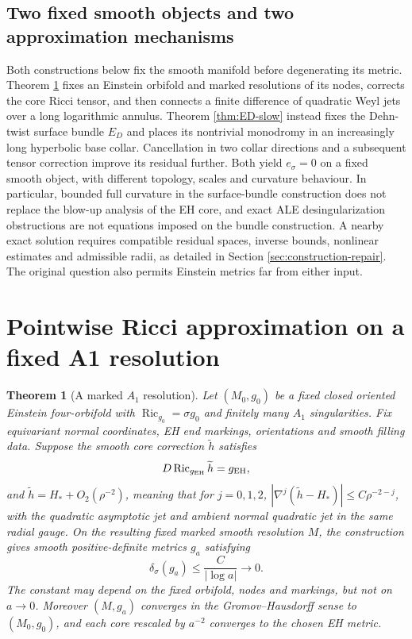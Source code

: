 \documentclass[a4paper,11pt]{article}
\numberwithin{equation}{section}
\newtheorem{theorem}{Theorem}[section]
\theoremstyle{definition}
\newcommand{\Ric}{\operatorname{Ric}}
\begin{document}
\subsection{Two fixed smooth objects and two approximation mechanisms}\label{sec:two-constructions}
Both constructions below fix the smooth manifold before degenerating its metric.
Theorem \ref{thm:A1} fixes an Einstein orbifold and marked resolutions of its nodes,
corrects the core Ricci tensor, and then connects a finite difference of quadratic Weyl jets over a long logarithmic annulus.
Theorem \ref{thm:ED-slow} instead fixes the Dehn-twist surface bundle $E_D$
and places its nontrivial monodromy in an increasingly long hyperbolic base collar.
Cancellation in two collar directions and a subsequent tensor correction improve its residual further.
Both yield $e_\sigma=0$ on a fixed smooth object, with different topology, scales and curvature behaviour.
In particular, bounded full curvature in the surface-bundle construction does not replace the blow-up analysis of the EH core,
and exact ALE desingularization obstructions are not equations imposed on the bundle construction.
A nearby exact solution requires compatible residual spaces, inverse bounds, nonlinear estimates and admissible radii,
as detailed in Section \ref{sec:construction-repair}. The original question also permits Einstein metrics far from either input.

\section{Pointwise Ricci approximation on a fixed A1 resolution}
\begin{theorem}[A marked $A_1$ resolution]\label{thm:A1}
Let $(M_0,g_0)$ be a fixed closed oriented Einstein four-orbifold with $\Ric_{g_0}=\sigma g_0$ and finitely many $A_1$ singularities. Fix equivariant normal coordinates, EH end markings, orientations and smooth filling data. Suppose the smooth core correction $\widetilde h$ satisfies
\[
D\Ric_{g_{\rm EH}}\widetilde h=g_{\rm EH},
\]
and $\widetilde h=H_*+O_2(\rho^{-2})$, meaning that for $j=0,1,2$,
$|\nabla^j(\widetilde h-H_*)|\le C\rho^{-2-j}$, with the quadratic asymptotic jet and ambient normal quadratic jet in the same radial gauge. On the resulting fixed marked smooth resolution $M$, the construction gives smooth positive-definite metrics $g_a$ satisfying
\begin{equation}\label{eq:A1}
\delta_\sigma(g_a)\le\frac{C}{|\log a|}\longrightarrow0.
\end{equation}
The constant may depend on the fixed orbifold, nodes and markings, but not on $a\to0$. Moreover $(M,g_a)$ converges in the Gromov--Hausdorff sense to $(M_0,g_0)$, and each core rescaled by $a^{-2}$ converges to the chosen EH metric.
\end{theorem}
\end{document}
